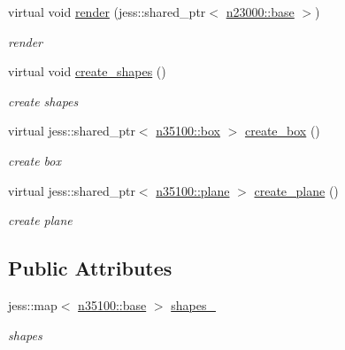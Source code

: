 \begin{DoxyCompactItemize}
virtual void \hyperlink{classnebula_1_1content_1_1actor_1_1admin_1_1rigid__actor_a2d1920022481d1e32da69c777ce73541}{render} (jess::shared\_\-ptr$<$ \hyperlink{classnebula_1_1platform_1_1renderer_1_1base}{n23000::base} $>$)
\begin{DoxyCompactList}\small\item\em render \item\end{DoxyCompactList}\item 
virtual void \hyperlink{classnebula_1_1content_1_1actor_1_1admin_1_1rigid__actor_a6a7daf14ba48ebe539588bfc18784267}{create\_\-shapes} ()
\begin{DoxyCompactList}\small\item\em create shapes \item\end{DoxyCompactList}\item 
virtual jess::shared\_\-ptr$<$ \hyperlink{classnebula_1_1content_1_1shape_1_1admin_1_1box}{n35100::box} $>$ \hyperlink{classnebula_1_1content_1_1actor_1_1admin_1_1rigid__actor_a7c5527f3ee596106a7b8b8f68953c820}{create\_\-box} ()
\begin{DoxyCompactList}\small\item\em create box \item\end{DoxyCompactList}\item 
virtual jess::shared\_\-ptr$<$ \hyperlink{classnebula_1_1content_1_1shape_1_1admin_1_1plane}{n35100::plane} $>$ \hyperlink{classnebula_1_1content_1_1actor_1_1admin_1_1rigid__actor_a60e98a9960bcad4ccc30d98e87dbe80c}{create\_\-plane} ()
\begin{DoxyCompactList}\small\item\em create plane \item\end{DoxyCompactList}\end{DoxyCompactItemize}
\subsection*{Public Attributes}
\begin{DoxyCompactItemize}
\item 
jess::map$<$ \hyperlink{classnebula_1_1content_1_1shape_1_1admin_1_1base}{n35100::base} $>$ \hyperlink{classnebula_1_1content_1_1actor_1_1admin_1_1rigid__actor_a979687ddafce2487456fe15f67befb8b}{shapes\_\-}
\begin{DoxyCompactList}\small\item\em shapes \item\end{DoxyCompactList}\end{DoxyCompactItemize}
